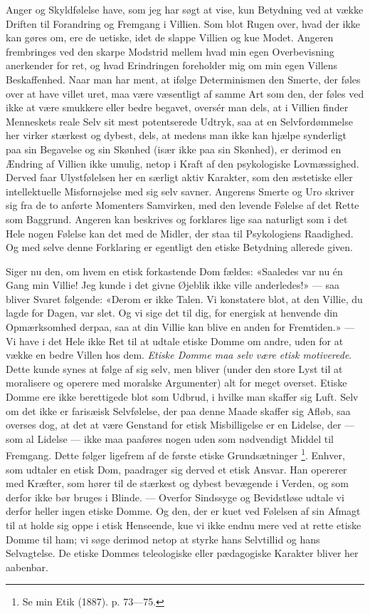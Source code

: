 \documentclass[12pt,a4paper,openany]{book}
\newcommand{\opage}[1]{\marginnote{\footnotesize\textit{[#1]}}}
\begin{document}
Anger og Skyldfølelse have, som jeg har søgt at vise, kun Betydning ved at
vække Driften til Forandring og Fremgang i Villien. Som blot Rugen over, hvad
der ikke kan gøres om, ere de uetiske, idet de slappe Villien og kue Modet.
Angeren frembringes ved den skarpe Modstrid mellem hvad min egen Overbevisning
anerkender for ret, og hvad Erindringen foreholder mig om min egen Villens
Beskaffenhed. Naar man har ment, at ifølge Determinismen den Smerte, der føles
over at have villet uret, maa være væsentligt af samme Art som den, der føles
ved ikke at være smukkere eller bedre begavet, oversér man dels, at i Villien
finder Menneskets reale Selv sit mest potentserede Udtryk, saa at en
Selvfordømmelse her virker stærkest og dybest, dels, at medens man ikke kan
hjælpe synderligt paa sin Begavelse og sin Skønhed (især ikke paa sin Skønhed),
er derimod en Ændring af Villien ikke umulig, netop i Kraft af den psykologiske
Lovmæssighed. Derved faar Ulystfølelsen her en særligt aktiv Karakter, som den
æstetiske eller intellektuelle Misfornøjelse med sig selv savner. Angerens
Smerte og Uro skriver sig fra de to anførte Momenters Samvirken, med den
levende Følelse af det Rette som Baggrund. Angeren kan beskrives og forklares
lige saa naturligt som i det Hele nogen Følelse kan det med de Midler, der staa
til Psykologiens Raadighed. Og med selve denne Forklaring er egentligt den
etiske Betydning allerede given.

\setcounter{footnote}{0}%
\opage{98}Siger nu den, om hvem en etisk forkastende Dom fældes: «Saaledes var
nu én Gang min Villie! Jeg kunde i det givne Øjeblik ikke ville anderledes!»
--- saa bliver Svaret følgende: «Derom er ikke Talen. Vi konstatere blot, at
den Villie, du lagde for Dagen, var slet. Og vi sige det til dig, for energisk
at henvende din Opmærksomhed derpaa, saa at din Villie kan blive en anden for
Fremtiden.» --- Vi have i det Hele ikke Ret til at udtale etiske Domme om
andre, uden for at vække en bedre Villen hos dem. \emph{Etiske Domme maa selv
være etisk motiverede}. Dette kunde synes at følge af sig selv, men bliver
(under den store Lyst til at moralisere og operere med moralske Argumenter) alt
for meget overset. Etiske Domme ere ikke berettigede blot som Udbrud, i hvilke
man skaffer sig Luft. Selv om det ikke er farisæisk Selvfølelse, der paa denne
Maade skaffer sig Afløb, saa overses dog, at det at være Genstand for etisk
Misbilligelse er en Lidelse, der --- som al Lidelse --- ikke maa paaføres nogen
uden som nødvendigt Middel til Fremgang. Dette følger ligefrem af de første
etiske Grundsætninger%
\footnote[1]{Se min Etik (1887). p. 73---75.}. Enhver, som udtaler en etisk
Dom, paadrager sig derved et etisk Ansvar. Han opererer med Kræfter, som hører
til de stærkest og dybest bevægende i Verden, og som derfor ikke bør bruges i
Blinde. --- Overfor Sindssyge og Bevidstløse udtale vi derfor heller ingen
etiske Domme. Og den, der er kuet ved Følelsen af sin Afmagt til at holde sig
oppe i etisk Henseende, kue vi ikke endnu mere ved at rette etiske Domme til
ham; vi søge derimod netop at styrke hans Selvtillid og hans Selvagtelse. De
etiske Dommes teleologiske eller pædagogiske Karakter bliver her aabenbar.
\end{document}
